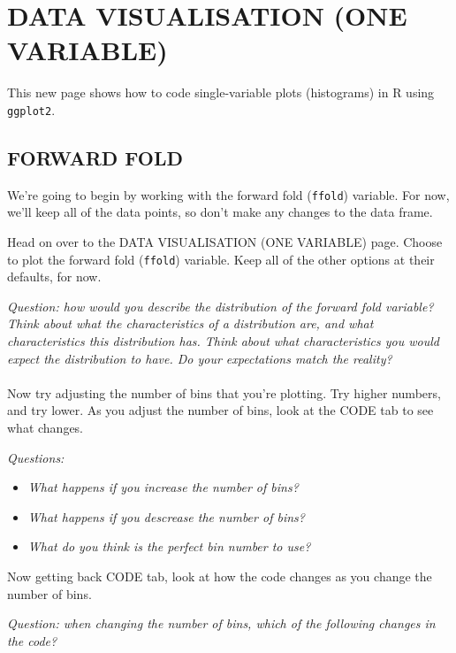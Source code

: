 \documentclass[
]{book}
\providecommand{\tightlist}{%
  \setlength{\itemsep}{0pt}\setlength{\parskip}{0pt}}
\begin{document}
\hypertarget{data-visualisation-one-variable}{%
\section{DATA VISUALISATION (ONE VARIABLE)}\label{data-visualisation-one-variable}}

This new page shows how to code single-variable plots (histograms) in R using
\texttt{ggplot2}.\\

\hypertarget{forward-fold}{%
\subsection{FORWARD FOLD}\label{forward-fold}}

We're going to begin by working with the forward fold (\texttt{ffold}) variable. For now,
we'll keep all of the data points, so don't make any changes to the data frame.

Head on over to the DATA VISUALISATION (ONE VARIABLE) page. Choose to plot the
forward fold (\texttt{ffold}) variable. Keep all of the other options at their defaults, for now.

\emph{Question: how would you describe the distribution of the forward fold variable?
Think about what the characteristics of a distribution are, and what characteristics
this distribution has. Think about what characteristics you would expect the
distribution to have. Do your expectations match the reality?}\\
~\\

Now try adjusting the number of bins that you're plotting. Try higher numbers, and try lower.
As you adjust the number of bins, look at the CODE tab to see what changes.

\emph{Questions:}

\begin{itemize}
\tightlist
\item
  \emph{What happens if you increase the number of bins?}
\item
  \emph{What happens if you descrease the number of bins?}
\item
  \emph{What do you think is the perfect bin number to use?}\\
\end{itemize}

Now getting back CODE tab, look at how the code changes as you change the number of bins.

\emph{Question: when changing the number of bins, which of the following changes in
the code?}
\end{document}
